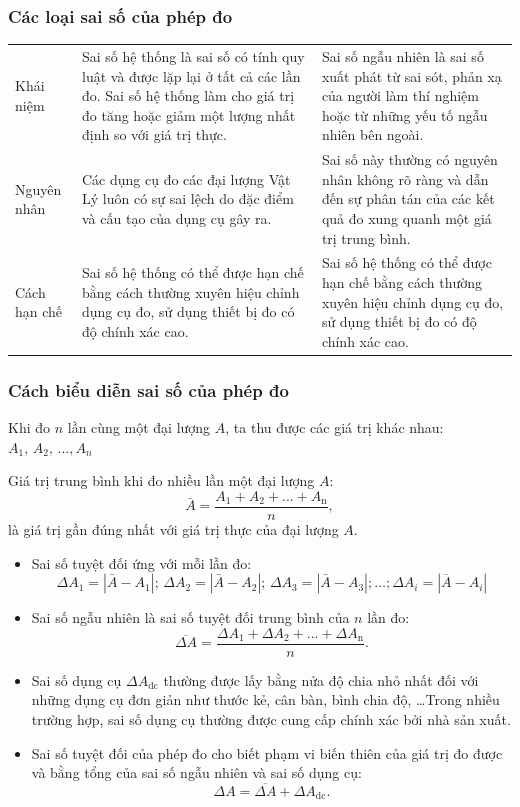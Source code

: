 \subsubsection{Các loại sai số của phép đo}
\begin{center}
	\begin{longtable}{|m{4em}|m{17em}|m{17em}|}
		\hline
		&\thead{Sai số hệ thống} & \thead{Sai số ngẫu nhiên}\\
		\hline
		Khái niệm & Sai số hệ thống là sai số có tính quy luật và được lặp lại ở tất cả các lần đo. Sai số hệ thống làm cho giá trị đo tăng hoặc giảm một lượng nhất định so với giá trị thực. & Sai số ngẫu nhiên là sai số xuất phát từ sai sót, phản xạ của người làm thí nghiệm hoặc từ những yếu tố ngẫu nhiên bên ngoài.\\
		\hline
		Nguyên nhân & Các dụng cụ đo các đại lượng Vật Lý luôn có sự sai lệch do đặc điểm và cấu tạo của dụng cụ gây ra. & Sai số này thường có nguyên nhân không rõ ràng và dẫn đến sự phân tán của các kết quả đo xung quanh một giá trị trung bình.\\
		\hline
		Cách hạn chế & Sai số hệ thống có thể được hạn chế bằng cách thường xuyên hiệu chỉnh dụng cụ đo, sử dụng thiết bị đo có độ chính xác cao. & Sai số hệ thống có thể được hạn chế bằng cách thường xuyên hiệu chỉnh dụng cụ đo, sử dụng thiết bị đo có độ chính xác cao.\\
		\hline
	\end{longtable}
\end{center}
\subsubsection{Cách biểu diễn sai số của phép đo}
Khi đo $n$ lần cùng một đại lượng $A$, ta thu được các giá trị khác nhau: $A_1,\, A_2,\,...,A_n$

Giá trị trung bình khi đo nhiều lần một đại lượng $A$:$$\bar{A}=\dfrac{A_1+A_2+...+A_{\text{n}}}{n},$$
là giá trị gần đúng nhất với giá trị thực của đại lượng $A$.  
\begin{itemize}
	\item Sai số tuyệt đối ứng với mỗi lần đo:
	$$\Delta A_1=|\bar{A}-A_1|;\,\Delta A_2=|\bar{A}-A_2|;\,\Delta A_3=|\bar{A}-A_3|;\dots; \Delta A_i=\left|\overline{A}-A_i\right|$$
	\item Sai số ngẫu nhiên là sai số tuyệt đối trung bình của $n$ lần đo:
	$$\overline{\Delta A}=\dfrac{\Delta A_1+\Delta A_2+...+\Delta A_{\textrm{n}} }{n}.$$
	\item Sai số dụng cụ $\Delta A_\text{dc}$ thường được lấy bằng nửa độ chia nhỏ nhất đối với những dụng cụ đơn giản như thước kẻ, cân bàn, bình chia độ, \dots Trong nhiều trường hợp, sai số dụng cụ thường được cung cấp chính xác bởi nhà sản xuất.
	\item Sai số tuyệt đối của phép đo cho biết phạm vi biến thiên của giá trị đo được và bằng tổng của sai số ngẫu nhiên và sai số dụng cụ:
	$$\Delta A= \overline{\Delta A}+ \Delta A_\text{dc}.$$
\end{itemize}
